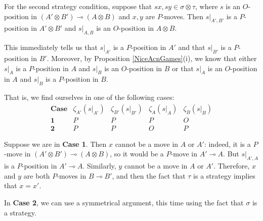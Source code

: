 \documentclass[11pt]{article} %
\theoremstyle{plain} %
\theoremstyle{definition} %
\theoremstyle{note}
\theoremstyle{exercisestyle}
\newcommand{\tensor}{\otimes}
\renewcommand{\implies}{\multimap}
\begin{document}
For the second strategy condition, suppose that $sx, sy\in\sigma\tensor \tau$, where $s$ is an $O$-position in $(A'\tensor B')\implies(A\tensor B)$ and $x,y$ are $P$-moves.  Then $s\vert_{A',B'}$ is a $P$-position in $A'\tensor B'$ and $s\vert_{A,B}$ is an $O$-position in $A\tensor B$.  

This immediately tells us that $s\vert_{A'}$ is a $P$-position in $A'$ and that $s\vert_{B'}$ is a $P$-position in $B'$.  Moreover, by Proposition \ref{NiceAcnGames}(i), we know that either $s\vert_{A}$ is a $P$-position in $A$ and $s\vert_{B}$ is an $O$-position in $B$ or that $s\vert_A$ is an $O$-position in $A$ and $s\vert_B$ is a $P$-position in $B$.  

That is, we find ourselves in one of the following cases:
\[
  \begin{array}{c|cccc}
    \textbf{Case} & \zeta_{A'}(s\vert_{A'}) & \zeta_{B'}(s\vert_{B'}) & \zeta_A(s\vert_A) & \zeta_B(s\vert_B) \\
    \hline
    \textbf{1} & P & P & P & O\\
    \textbf{2} & P & P & O & P
  \end{array}
  \]

Suppose we are in \textbf{Case 1}.  Then $x$ cannot be a move in $A$ or $A'$: indeed, it is a $P$-move in $(A'\tensor B')\implies (A\tensor B)$, so it would be a $P$-move in $A'\implies A$.  But $s\vert_{A',A}$ is a $P$-position in $A'\implies A$.  Similarly, $y$ cannot be a move in $A$ or $A'$.  Therefore, $x$ and $y$ are both $P$-moves in $B\implies B'$, and then the fact that $\tau$ is a strategy implies that $x=x'$.  

In \textbf{Case 2}, we can use a symmetrical argument, this time using the fact that $\sigma$ is a strategy.  
\end{document}
